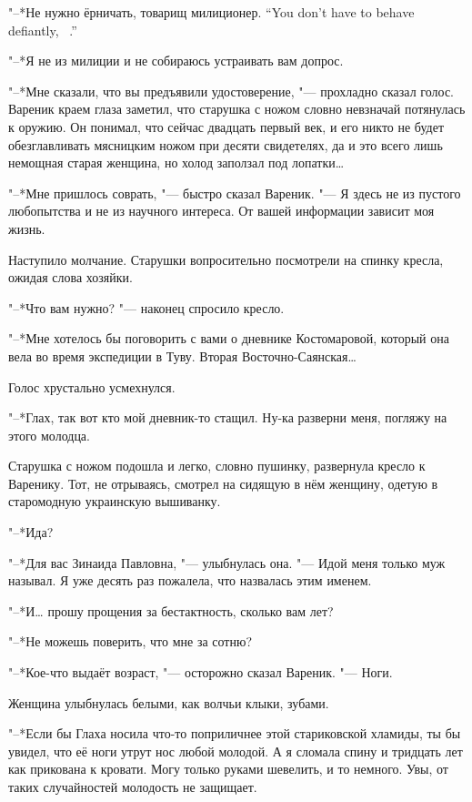 {"--*Не нужно ёрничать, товарищ милиционер.}
{``You don't have to behave defiantly, \tovarisch\ \militsioner.''}

"--*Я не из милиции и не собираюсь устраивать вам допрос.

"--*Мне сказали, что вы предъявили удостоверение, "--- прохладно сказал голос.
Вареник краем глаза заметил, что старушка с ножом словно невзначай потянулась к оружию.
Он понимал, что сейчас двадцать первый век, и его никто не будет обезглавливать мясницким ножом при десяти свидетелях, да и это всего лишь немощная старая женщина, но холод заползал под лопатки\ldots{}

"--*Мне пришлось соврать, "--- быстро сказал Вареник.
"--- Я здесь не из пустого любопытства и не из научного интереса.
От вашей информации зависит моя жизнь.

Наступило молчание.
Старушки вопросительно посмотрели на спинку кресла, ожидая слова хозяйки.

"--*Что вам нужно? "--- наконец спросило кресло.

"--*Мне хотелось бы поговорить с вами о дневнике Костомаровой, который она вела во время экспедиции в Туву.
Вторая Восточно-Саянская\ldots{}

Голос хрустально усмехнулся.

"--*Глах, так вот кто мой дневник-то стащил.
Ну-ка разверни меня, погляжу на этого молодца.

Старушка с ножом подошла и легко, словно пушинку, развернула кресло к Варенику.
Тот, не отрываясь, смотрел на сидящую в нём женщину, одетую в старомодную украинскую вышиванку.

"--*Ида?

"--*Для вас Зинаида Павловна, "--- улыбнулась она.
"--- Идой меня только муж называл.
Я уже десять раз пожалела, что назвалась этим именем.

"--*И\ldots{} прошу прощения за бестактность, сколько вам лет?

"--*Не можешь поверить, что мне за сотню?

"--*Кое-что выдаёт возраст, "--- осторожно сказал Вареник.
"--- Ноги.

Женщина улыбнулась белыми, как волчьи клыки, зубами.

"--*Если бы Глаха носила что-то поприличнее этой стариковской хламиды, ты бы увидел, что её ноги утрут нос любой молодой.
А я сломала спину и тридцать лет как прикована к кровати.
Могу только руками шевелить, и то немного.
Увы, от таких случайностей молодость не защищает.

